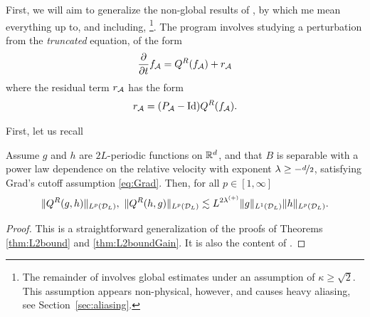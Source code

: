 First, we will aim to generalize the non-global results of \cite{Filbet11}, by
which me mean everything up to, and including, \cite[Proposition
4.6]{Filbet11}\footnote{The remainder of \cite{Filbet11} involves global estimates under an assumption of
  $\kappa\geq\sqrt{2}$. This assumption appears non-physical, however, and causes heavy aliasing, see 
  Section~\ref{sec:aliasing}.}. The program involves studying a perturbation from the {\em
  truncated} equation, of the form
\begin{equation} \label{eqn:pert}
    \frac{\partial}{\partial t}{f}_{\mathcal{A}} = Q^R(f_{\mathcal{A}}) + r_{\mathcal{A}}
\end{equation}
where the residual term $r_{\mathcal{A}}$ has the form
\[
    r_{\mathcal{A}} = (P_{\mathcal{A}}-\operatorname{Id})Q^R(f_{\mathcal{A}}).
\]

First, let us recall
\begin{lemma}\label{lem:bound}
  Assume $g$ and $h$ are $2L$-periodic functions on $\mathbb{R}^d$, and that $B$ is
  separable with a power law dependence on the relative velocity with
  exponent $\lambda \geq -\nicefrac{d}{2}$, satisfying Grad's cutoff assumption
  \eqref{eq:Grad}. Then, for all $p\in [1,\infty]$
    $$ 
        \|Q^R(g,h)\|_{L^p(\cD_L)},\ \|Q^R(h,g)\|_{L^p(\cD_L)} \lesssim 
            L^{2\ml} \|g\|_{L^1(\cD_L)}
            \|h\|_{L^p(\cD_L)}. 
    $$
\end{lemma}
\begin{proof}
This is a straightforward generalization of the proofs of Theorems
\ref{thm:L2bound} and \ref{thm:L2boundGain}. It is also the content of 
\cite[Lemma 4.1]{Filbet11}.
\end{proof}


